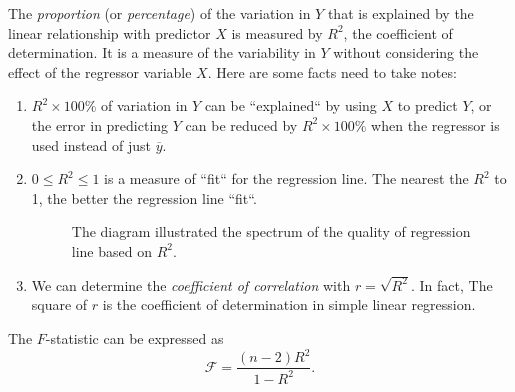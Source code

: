 The \textit{proportion} (or \textit{percentage}) of the variation in $Y$ that is explained by the linear relationship with predictor $X$ 
is measured by $R^2$, the coefficient of determination. It is a measure of the variability in $Y$ without considering the 
effect of the regressor variable $X$. Here are some facts need to take notes:
\begin{enumerate}
    \item $R^2 \times 100\%$ of variation in $Y$ can be ``explained`` by using $X$ to predict $Y$, or the error in predicting 
        $Y$ can be reduced by $R^2 \times 100\%$ when the regressor is used instead of just $\overline{y}$.
    \item $0 \leq R^2 \leq 1$ is a measure of ``fit`` for the regression line. The nearest the $R^2$ to 1, the better the 
    regression line ``fit``.

    \begin{figure}[ht]
        \pgfplotsset{compat=1.12}
        \begin{center}
        \end{center}
        \caption{The diagram illustrated the spectrum of the quality of regression line based on $R^2$.}
    \end{figure}

    \item We can determine the \textit{coefficient of correlation} with $r = \sqrt{R^2}$. In fact, The square of $r$ is the 
    coefficient of determination in simple linear regression.
\end{enumerate}

\begin{theorem}
    The $F$-statistic can be expressed as 
    \begin{equation}
        \mathcal{F} = \frac{(n-2)R^2}{1-R^2}.
    \end{equation}
\end{theorem}

